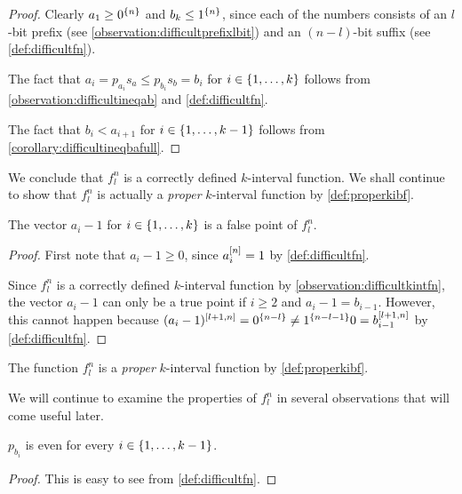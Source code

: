 \begin{proof}
Clearly $a_1 \geq 0^{\{n\}}$ and $b_k \leq 1^{\{n\}}$,
since each of the numbers consists of an $l$-bit prefix
(see \cref{observation:difficultprefixlbit})
and an $(n-l)$-bit suffix
(see \cref{def:difficultfn}).

The fact that $a_i = p_{a_i} s_a \leq p_{b_i} s_b = b_i$
for $i \in \{1, \ldots, k\}$ follows from
\cref{observation:difficultineqab}
and \cref{def:difficultfn}.

The fact that
$b_i < a_{i+1}$ for $i \in \{1, \ldots, k-1\}$
follows from \cref{corollary:difficultineqbafull}.
\end{proof}

We conclude that $f_l^n$
is a correctly defined $k$-interval function.
We shall continue to show that $f_l^n$ is actually
a \emph{proper} $k$-interval function
by \cref{def:properkibf}.

\begin{observation}
\label{observation:difficultafp}
The vector $a_i - 1$ for $i \in \{1, \ldots, k\}$
is a false point of $f_l^n$.
\end{observation}

\begin{proof}
First note that $a_i - 1 \geq 0$,
since $a_i^{[n]} = 1$ by \cref{def:difficultfn}.

Since $f_l^n$ is a correctly defined
$k$-interval function
by \cref{observation:difficultkintfn},
the vector $a_i - 1$
can only be a true point if
$i \geq 2$
and $a_i - 1 = b_{i-1}$.
However, this cannot happen because
$(a_i - 1)^{[l+1, n]} = 0^{\{n-l\}} \neq 1^{\{n-l-1\}} 0 = b_{i-1}^{[l+1, n]}$
by \cref{def:difficultfn}.
\end{proof}

\begin{corollary}
\label{corollary:difficultproper}
The function $f_l^n$
is a \emph{proper} $k$-interval function
by \cref{def:properkibf}.
\end{corollary}

We will continue to examine the properties of $f_l^n$
in several observations that will come useful later.

\begin{observation}
\label{observation:difficultprefixbeven}
$p_{b_i}$ is even
for every $i \in \{1, \ldots, k-1\}$.
\end{observation}

\begin{proof}
This is easy to see from \cref{def:difficultfn}.
\end{proof}

